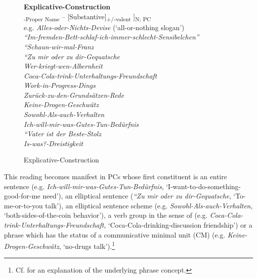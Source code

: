 \documentclass[output=paper]{LSP/langsci}
\begin{document}
\begin{figure}\raggedright
\begin{framed}
\caption{Explicative-Construction\label{fig:hein:1.1}}
\noindent \textbf{Explicative-Construction}\\
\noindent [[Sentence/Sentence-ellipt /Sentence-Scheme-ellipt /Verb Group\textsubscript{+CM}/Phrase\textsubscript{+CM}]\textsubscript{{}-Proper Name} -- [Substantive]\textsubscript{+/-valent} ]\textsubscript{N; PC}\\
\vspace{\baselineskip}
\noindent
e.g. \textit{Alles-oder-Nichts-Devise} (‘all-or-nothing slogan')\\
\textit{``Im-fremden-Bett-schlaf-ich-immer-schlecht-Sensibelchen''}\\
\textit{``Schaun-wir-mal-Franz{\textquotedbl} }\\
\textit{``Zu mir oder zu dir{\textquotedbl}-Gequatsche}\\
\textit{Wer-kriegt-wen-Albernheit}\\
\textit{Coca-Cola-trink-Unterhaltungs-Freundschaft}\\
\textit{Work-in-Progress-Dings}\\
\textit{Zurück-zu-den-Grundsätzen-Rede}\\
\textit{Keine-Drogen-Geschwätz}\\
\textit{Sowohl-Als-auch-Ver\-hal\-ten}\\
\textit{Ich-will-mir-was-Gutes-Tun-Bedürfnis}\\
\textit{``Vater ist der Beste{\textquotedbl}-Stolz}\\
\textit{Is-was?-Dreistigkeit}
\end{framed}
\end{figure}

\largerpage[2]
This reading becomes manifest in PCs whose first constituent is an entire sentence (e.g. \textit{Ich-will-mir-was-Gutes-Tun-Bedürfnis}, ‘I-want-to-do-something-good-for-me need’), an elliptical sentence (\textit{``Zu mir oder zu dir{\textquotedbl}-Gequatsche}, ‘To-me-or-to-you talk’), an elliptical sentence scheme (e.g. \textit{Sowohl-Als-auch-Ver\-hal\-ten}, ‘both-sides-of-the-coin behavior’), a verb group in the sense of \citet{ZifonunEtAl1997} (e.g. \textit{Coca-Cola-trink-Unterhaltungs-Freundschaft}, ‘Coca-Cola-drinking-\linebreak discussion friendship’) or a phrase which has the status of a communicative minimal unit (CM) (e.g. \textit{Keine-Drogen-Geschwätz}, ‘no-drugs talk’).\footnote{Cf. \citet[Chapter~III.2.2.1.2]{Hein2015} for an explanation of the underlying phrase concept.} 
\end{document}
